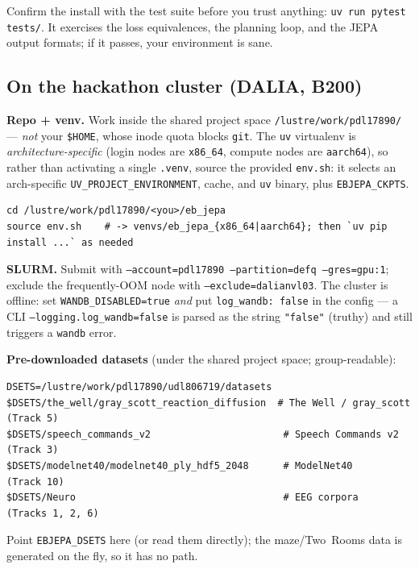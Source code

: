 \documentclass{article}
\newcommand{\code}[1]{\texttt{\small #1}}
\newcommand{\file}[1]{\texttt{\small #1}}
\begin{document}
\begin{tipbox}
Confirm the install with the test suite before you trust anything:
\code{uv run pytest tests/}. It exercises the loss equivalences, the planning
loop, and the JEPA output formats; if it passes, your environment is sane.
\end{tipbox}

\subsection{On the hackathon cluster (DALIA, B200)}
\label{sec:cluster}

\textbf{Repo + venv.} Work inside the shared project space \code{/lustre/work/pdl17890/}
--- \emph{not} your \code{\$HOME}, whose inode quota blocks \code{git}. The \code{uv}
virtualenv is \emph{architecture-specific} (login nodes are \code{x86\_64}, compute
nodes are \code{aarch64}), so rather than activating a single \code{.venv}, source the
provided \file{env.sh}: it selects an arch-specific \code{UV\_PROJECT\_ENVIRONMENT},
cache, and \code{uv} binary, plus \code{EBJEPA\_CKPTS}.
\begin{lstlisting}[style=bash]
cd /lustre/work/pdl17890/<you>/eb_jepa
source env.sh    # -> venvs/eb_jepa_{x86_64|aarch64}; then `uv pip install ...` as needed
\end{lstlisting}

\textbf{SLURM.} Submit with \code{--account=pdl17890 --partition=defq --gres=gpu:1};
exclude the frequently-OOM node with \code{--exclude=dalianvl03}. The cluster is
offline: set \code{WANDB\_DISABLED=true} \emph{and} put \code{log\_wandb: false} in
the config --- a CLI \code{--logging.log\_wandb=false} is parsed as the string
\code{"false"} (truthy) and still triggers a \code{wandb} error.

\textbf{Pre-downloaded datasets} (under the shared project space; group-readable):
\begin{lstlisting}[style=bash]
DSETS=/lustre/work/pdl17890/udl806719/datasets
$DSETS/the_well/gray_scott_reaction_diffusion  # The Well / gray_scott (Track 5)
$DSETS/speech_commands_v2                       # Speech Commands v2  (Track 3)
$DSETS/modelnet40/modelnet40_ply_hdf5_2048      # ModelNet40          (Track 10)
$DSETS/Neuro                                    # EEG corpora        (Tracks 1, 2, 6)
\end{lstlisting}
Point \code{EBJEPA\_DSETS} here (or read them directly); the maze/Two~Rooms data is
generated on the fly, so it has no path.
\end{document}

